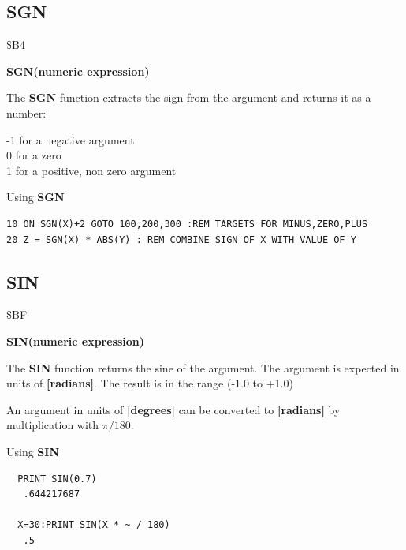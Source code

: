 \subsection{SGN}
\begin{description}[leftmargin=2cm,style=nextline]
\item [Token:] \$B4
\item [Format:] {\bf SGN(numeric expression)}
\item [Usage:] The {\bf SGN} function extracts the sign from
               the argument and returns it as a number:

               -1 for a negative argument \\
                0 for a zero              \\
                1 for a positive, non zero argument

\item [Example:] Using {\bf SGN}
\begin{tcolorbox}[colback=black,coltext=white]
\verbatimfont{\codefont}
\begin{verbatim}
10 ON SGN(X)+2 GOTO 100,200,300 :REM TARGETS FOR MINUS,ZERO,PLUS
20 Z = SGN(X) * ABS(Y) : REM COMBINE SIGN OF X WITH VALUE OF Y
\end{verbatim}
\end{tcolorbox}
\end{description}


\newpage
\subsection{SIN}
\begin{description}[leftmargin=2cm,style=nextline]
\item [Token:] \$BF
\item [Format:] {\bf SIN(numeric expression)}
\item [Usage:] The {\bf SIN} function returns the sine of the
               argument.
               The argument is expected in units of {\bf [radians]}.
               The result is in the range (-1.0 to +1.0)

\item [Remarks:] An argument in units of {\bf [degrees]}
                 can be converted to {\bf [radians]}
               by multiplication with $\pi/180$.
\item [Example:] Using {\bf SIN}
\begin{tcolorbox}[colback=black,coltext=white]
\verbatimfont{\codefont}
\begin{verbatim}
  PRINT SIN(0.7)
   .644217687

  X=30:PRINT SIN(X * ~ / 180)
   .5
\end{verbatim}
\end{tcolorbox}
\end{description}


